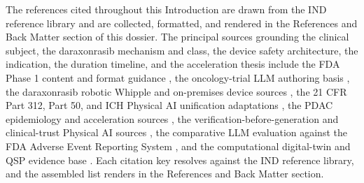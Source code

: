 The references cited throughout this Introduction are drawn from the IND reference
library and are collected, formatted, and rendered in the References and Back Matter
section of this dossier. The principal sources grounding the clinical subject, the
daraxonrasib mechanism and class, the device safety architecture, the indication,
the duration timeline, and the acceleration thesis include the FDA Phase 1 content
and format guidance \cite{phase1guidance}, the oncology-trial LLM authoring basis
\cite{oncotrialllm}, the daraxonrasib robotic Whipple and on-premises device sources
\cite{daraxwhipple, onpremwhippl}, the 21 CFR Part 312, Part 50, and ICH Physical AI
unification adaptations \cite{cfr312paiuni, cfr050paiuni, ichpaistduni}, the PDAC
epidemiology and acceleration sources \cite{pdac060s2030, paipredict4x,
natlpaiplatf}, the verification-before-generation and clinical-trust Physical AI
sources \cite{congress9510, clintrustpai, paiautospons, paisitedocpk}, the
comparative LLM evaluation against the FDA Adverse Event Reporting System
\cite{llmcomp16fda}, and the computational digital-twin and QSP evidence base
\cite{fdadigtwinpc, qspmetpancre, chatgpt100kp, pdacdigtwinp}. Each citation key
resolves against the IND reference library, and the assembled list renders in the
References and Back Matter section.
